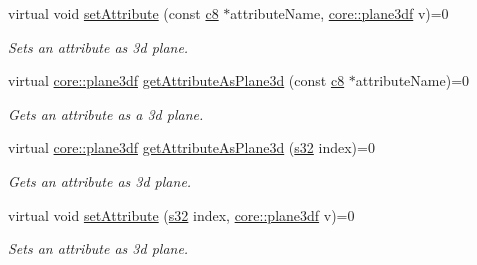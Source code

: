 \begin{DoxyCompactItemize}
\mbox{\label{classirr_1_1io_1_1IAttributes_a6a4cb4cb9c5296fc05892f0821009609}} 
virtual void \hyperlink{classirr_1_1io_1_1IAttributes_a6a4cb4cb9c5296fc05892f0821009609}{set\+Attribute} (const \hyperlink{namespaceirr_a9395eaea339bcb546b319e9c96bf7410}{c8} $\ast$attribute\+Name, \hyperlink{namespaceirr_1_1core_ae7491b7985dcb74b840bfcd9c054b232}{core\+::plane3df} v)=0
\begin{DoxyCompactList}\small\item\em Sets an attribute as 3d plane. \end{DoxyCompactList}\item 
virtual \hyperlink{namespaceirr_1_1core_ae7491b7985dcb74b840bfcd9c054b232}{core\+::plane3df} \hyperlink{classirr_1_1io_1_1IAttributes_a1d660e66f832cd670a47f5898bc0f5df}{get\+Attribute\+As\+Plane3d} (const \hyperlink{namespaceirr_a9395eaea339bcb546b319e9c96bf7410}{c8} $\ast$attribute\+Name)=0
\begin{DoxyCompactList}\small\item\em Gets an attribute as a 3d plane. \end{DoxyCompactList}\item 
virtual \hyperlink{namespaceirr_1_1core_ae7491b7985dcb74b840bfcd9c054b232}{core\+::plane3df} \hyperlink{classirr_1_1io_1_1IAttributes_adcb6bc5b7d76f8299b587b34b7dfaeee}{get\+Attribute\+As\+Plane3d} (\hyperlink{namespaceirr_ac66849b7a6ed16e30ebede579f9b47c6}{s32} index)=0
\begin{DoxyCompactList}\small\item\em Gets an attribute as 3d plane. \end{DoxyCompactList}\item 
\mbox{\label{classirr_1_1io_1_1IAttributes_a51277b8aa2971cb070ab9ebfadf586a1}} 
virtual void \hyperlink{classirr_1_1io_1_1IAttributes_a51277b8aa2971cb070ab9ebfadf586a1}{set\+Attribute} (\hyperlink{namespaceirr_ac66849b7a6ed16e30ebede579f9b47c6}{s32} index, \hyperlink{namespaceirr_1_1core_ae7491b7985dcb74b840bfcd9c054b232}{core\+::plane3df} v)=0
\begin{DoxyCompactList}\small\item\em Sets an attribute as 3d plane. \end{DoxyCompactList}\item 
\mbox{\label{classirr_1_1io_1_1IAttributes_a0f27f971247a14b10945bade9534b045}} 

\end{DoxyCompactItemize}
